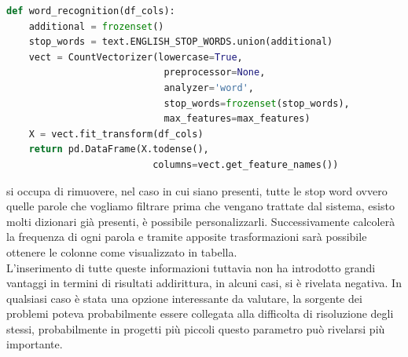 \documentclass[%
    corpo=12pt,
    twoside,
    oldstyle,
    autoretitolo,
    greek,
    evenboxes,
]{toptesi}
\begin{document}
\begin{lstlisting}[language=Python, frame=single, basicstyle=\small]
  def word_recognition(df_cols):
    additional = frozenset()
    stop_words = text.ENGLISH_STOP_WORDS.union(additional)
    vect = CountVectorizer(lowercase=True, 
                            preprocessor=None, 
                            analyzer='word', 
                            stop_words=frozenset(stop_words),
                            max_features=max_features)
    X = vect.fit_transform(df_cols)
    return pd.DataFrame(X.todense(), 
                          columns=vect.get_feature_names())
\end{lstlisting}
si occupa di rimuovere, nel caso in cui siano presenti, tutte le stop word ovvero quelle parole che vogliamo filtrare prima che vengano trattate dal sistema, esisto molti dizionari già presenti, è possibile personalizzarli. Successivamente calcolerà la frequenza di ogni parola e tramite apposite trasformazioni sarà possibile ottenere le colonne come visualizzato in tabella.\\
L'inserimento di tutte queste informazioni tuttavia non ha introdotto grandi vantaggi in termini di risultati addirittura, in alcuni casi, si è rivelata negativa. In qualsiasi caso è stata una opzione interessante da valutare, la sorgente dei problemi poteva probabilmente essere collegata alla difficolta di risoluzione degli stessi, probabilmente in progetti più piccoli questo parametro può rivelarsi più importante.
\end{document}
